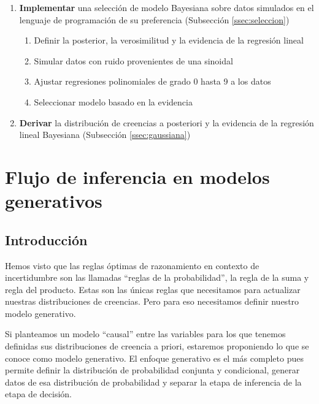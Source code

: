 \documentclass[a4paper,10pt]{article}
\begin{document}
\begin{enumerate}
 \begin{enumerate}
 \item \textbf{Implementar} una selección de modelo Bayesiana sobre datos simulados en el lenguaje de programaci\'on de su preferencia (Subsecci\'on \ref{ssec:seleccion})
 \begin{enumerate}[i]
  \item Definir la posterior, la verosimilitud y la evidencia de la regresi\'on lineal
  \item Simular datos con ruido provenientes de una sinoidal
  \item Ajustar regresiones polinomiales de grado 0 hasta 9 a los datos
  \item Seleccionar modelo basado en la evidencia
 \end{enumerate}
 \item \textbf{Derivar} la distribuci\'on de creencias a posteriori y la evidencia de la regresi\'on lineal Bayesiana (Subsecci\'on \ref{ssec:gaussiana})
\end{enumerate}
\end{enumerate}


\newpage  

\section{Flujo de inferencia en modelos generativos} \label{sec:flujo}

\subsection{Introducci\'on}

Hemos visto que las reglas \'optimas de razonamiento en contexto de incertidumbre son las llamadas ``reglas de la probabilidad'', la regla de la suma y regla del producto.
Estas son las \'unicas reglas que necesitamos para actualizar nuestras distribuciones de creencias.
Pero para eso necesitamos definir nuestro modelo generativo.

Si planteamos un modelo ``causal'' entre las variables para los que tenemos definidas sus distribuciones de creencia a priori, estaremos proponiendo lo que se conoce como modelo generativo.
El enfoque generativo es el m\'as completo pues permite definir la distribuci\'on de probabilidad conjunta y condicional, generar datos de esa distribuci\'on de probabilidad y separar la etapa de inferencia de la etapa de decisi\'on.

\vspace{0.3cm}
\end{document}

